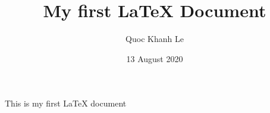 \documentclass{article}
\begin{document}
\author{Quoc Khanh Le}
\title{My first \LaTeX{} Document}
\date{13 August 2020}
\maketitle

This is my first \LaTeX{} document
\end{document}
